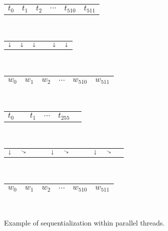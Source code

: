 \begin{figure}
  \centering
  \begin{minipage}{0.45\textwidth}
    \centering
      \begin{tabular}{C{0.6cm}C{0.6cm}C{0.6cm}C{0.6cm}C{0.6cm}C{0.6cm}}
        $t_0$ & $t_1$ & $t_2$ & $\cdots$ & $t_{510}$ & $t_{511}$\\
      \end{tabular}\\[-0.5ex]
      \begin{tabular}{C{0.6cm}C{0.6cm}C{0.6cm}C{0.6cm}C{0.6cm}C{0.6cm}}
        $\shortdownarrow$ & $\shortdownarrow$ & $\shortdownarrow$ & & $\shortdownarrow$ & $\shortdownarrow$\\
      \end{tabular}\\[-0.5ex]
      \begin{tabular}{|C{0.6cm}|C{0.6cm}|C{0.6cm}|C{0.6cm}|C{0.6cm}|C{0.6cm}|}
        \hline
        $w_0$ & $w_1$ & $w_2$ & $\cdots$ & $w_{510}$ & $w_{511}$\\
        \hline
      \end{tabular}\\
    \end{minipage}
    \begin{minipage}{0.45\textwidth}
      \centering
      \begin{tabular}{C{0.6cm}C{0.6cm}C{0.6cm}C{0.6cm}C{0.6cm}C{0.6cm}}
        $t_0$ &  & $t_1$ & $\cdots$ & $t_{255}$ & \\
      \end{tabular}\\[-0.5ex]
      \begin{tabular}{C{0.105cm}C{0.105cm}C{0.105cm}C{0.105cm}C{0.105cm}C{0.105cm}C{0.105cm}C{0.105cm}C{0.105cm}C{0.105cm}C{0.105cm}}
        $\shortdownarrow$ & $\diagonalarrowdown$ &  &  & $\shortdownarrow$ & $\diagonalarrowdown$ &  &  & $\shortdownarrow$ & $\diagonalarrowdown$ & \\
      \end{tabular}\\[-0.5ex]
      \begin{tabular}{|C{0.6cm}|C{0.6cm}|C{0.6cm}|C{0.6cm}|C{0.6cm}|C{0.6cm}|}
        \hline
        $w_0$ & $w_1$ & $w_2$ & $\cdots$ & $w_{510}$ & $w_{511}$\\
        \hline
      \end{tabular}\\
    \end{minipage}
    \caption{Example of sequentialization within parallel threads.}
    \label{fig:seqexa}
\end{figure}

